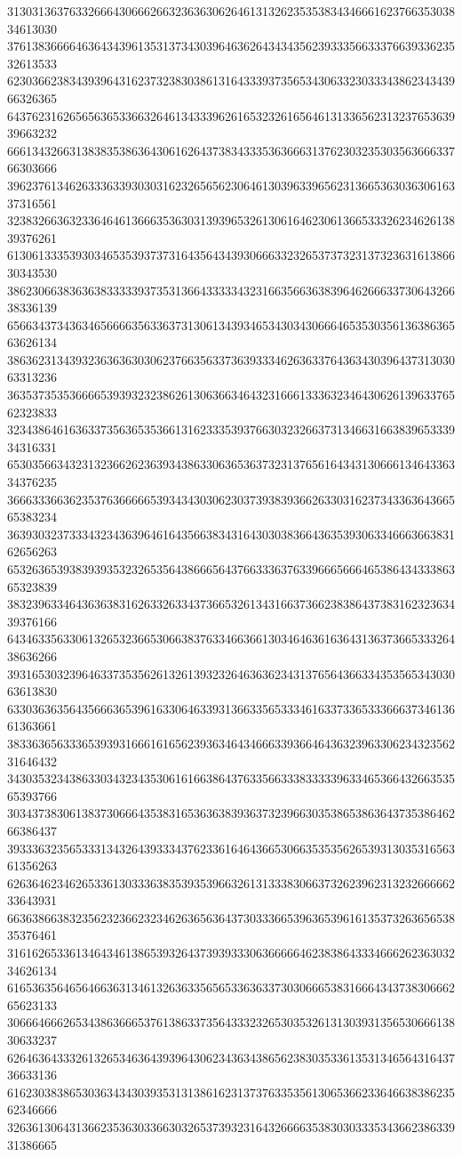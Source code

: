 31303136376332666430666266323636306264613132623535383434666162376635303834613030
37613836666463643439613531373430396463626434343562393335663337663933623532613533
62303662383439396431623732383038613164333937356534306332303334386234343966326365
64376231626565636533663264613433396261653232616564613133656231323765363939663232
66613432663138383538636430616264373834333536366631376230323530356366633766303666
39623761346263336339303031623265656230646130396339656231366536303630616337316561
32383266363233646461366635363031393965326130616462306136653332623462613839376261
61306133353930346535393737316435643439306663323265373732313732363161386630343530
38623066383636383333393735313664333334323166356636383964626663373064326638336139
65663437343634656666356336373130613439346534303430666465353035613638636563626134
38636231343932363636303062376635633736393334626363376436343039643731303063313236
36353735353666653939323238626130636634643231666133363234643062613963376562323833
32343864616363373563653536613162333539376630323266373134663166383965333934316331
65303566343231323662623639343863306365363732313765616434313066613464336334376235
36663336636235376366666539343430306230373938393662633031623734336364366565383234
36393032373334323436396461643566383431643030383664363539306334666366383162656263
65326365393839393532326535643866656437663336376339666566646538643433386365323839
38323963346436363831626332633437366532613431663736623838643738316232363439376166
64346335633061326532366530663837633466366130346463616364313637366533326438636266
39316530323964633735356261326139323264636362343137656436633435356534303063613830
63303636356435666365396163306463393136633565333461633733653336663734613661363661
38336365633365393931666161656239363464346663393664643632396330623432356231646432
34303532343863303432343530616166386437633566333833333963346536643266353565393766
30343738306138373066643538316536363839363732396630353865386364373538646266386437
39333632356533313432643933343762336164643665306635353562653931303531656361356263
62636462346265336130333638353935396632613133383066373262396231323266666233643931
66363866383235623236623234626365636437303336653963653961613537326365653835376461
31616265336134643461386539326437393933306366666462383864333466626236303234626134
61653635646564663631346132636335656533636337303066653831666434373830666265623133
30666466626534386366653761386337356433323265303532613130393135653066613830633237
62646364333261326534636439396430623436343865623830353361353134656431643736633136
61623038386530363434303935313138616231373763353561306536623364663838623562346666
32636130643136623536303366303265373932316432666635383030333534366238633931386665
